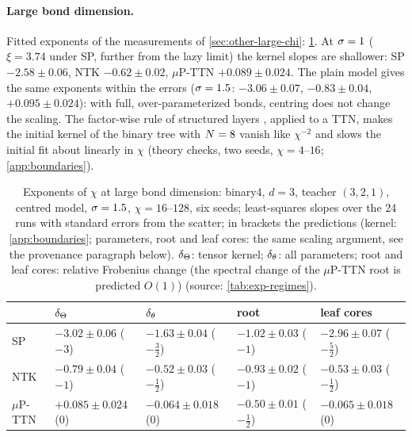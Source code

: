 \paragraph{Large bond dimension.}
\empirical{} Fitted exponents of the measurements of \cref{sec:other-large-chi}: \cref{tab:large-chi}. At $\sigma=1$
($\xi=3.74$ under SP, further from the lazy limit) the kernel slopes are shallower: SP $-2.58\pm0.06$, NTK
$-0.62\pm0.02$, $\mu$P-TTN $+0.089\pm0.024$. The plain model gives the same exponents within the errors ($\sigma=1.5$:
$-3.06\pm0.07$, $-0.83\pm0.04$, $+0.095\pm0.024$): with full, over-parameterized bonds, centring does not change the
scaling. The factor-wise rule of structured layers \citep{qiu2024compute,potapczynski2024searching}, applied to a TTN,
makes the initial kernel of the binary tree with $N=8$ vanish like $\chi^{-2}$ and slows the initial fit about
linearly in $\chi$ (theory checks, two seeds, $\chi=4$--$16$; \cref{app:boundaries}).

\begin{table}[htbp]
  \centering
  \caption{Exponents of $\chi$ at large bond dimension: binary4, $d=3$, teacher $(3,2,1)$, centred model,
    $\sigma=1.5$, $\chi=16$--$128$, six seeds; least-squares slopes over the 24 runs with standard errors from the
    scatter; in brackets the predictions (kernel: \cref{app:boundaries}; parameters, root and leaf cores: the same
    scaling argument, see the provenance paragraph below). $\delta_{\Theta}$: tensor kernel; $\delta_{\theta}$: all parameters;
    root and leaf cores: relative Frobenius change (the spectral change of the $\mu$P-TTN root is predicted
    $O(1)$) (source: \cref{tab:exp-regimes}).}
  \label{tab:large-chi}
  \footnotesize
  \begin{tabular}{@{}lllll@{}}
    \toprule
    & $\delta_{\Theta}$ & $\delta_{\theta}$ & root & leaf cores \\
    \midrule
    SP & $-3.02\pm0.06$ ($-3$) & $-1.63\pm0.04$ ($-\frac32$) & $-1.02\pm0.03$ ($-1$) & $-2.96\pm0.07$ ($-\frac52$) \\
    NTK & $-0.79\pm0.04$ ($-1$) & $-0.52\pm0.03$ ($-\frac12$) & $-0.93\pm0.02$ ($-1$) & $-0.53\pm0.03$ ($-\frac12$) \\
    $\mu$P-TTN & $+0.085\pm0.024$ ($0$) & $-0.064\pm0.018$ ($0$) & $-0.50\pm0.01$ ($-\frac12$) & $-0.065\pm0.018$ ($0$) \\
    \bottomrule
  \end{tabular}
\end{table}

